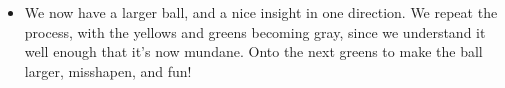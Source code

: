 \documentclass{article}
\begin{document}
\begin{itemize}
\item We now have a larger ball, and a nice insight in one direction. We repeat the process, with the yellows and greens becoming gray,
  since we understand it well enough that it's now mundane. Onto the next greens to make the ball larger, misshapen, and fun!

\end{itemize}
\end{document}
